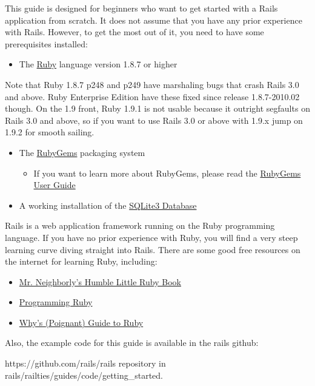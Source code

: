 \documentclass[10pt]{book}
\begin{document}
This guide is designed for beginners who want to get started with a Rails application from scratch. It does not assume that you have any prior experience with Rails. However, to get the most out of it, you need to have some prerequisites installed:
\begin{itemize}
	\item The \href{http://www.ruby-lang.org/en/downloads}{Ruby} language version 1.8.7 or higher
\end{itemize}

Note that Ruby 1.8.7 p248 and p249 have marshaling bugs that crash Rails 3.0 and above. Ruby Enterprise Edition have these fixed since release 1.8.7-2010.02 though. On the 1.9 front, Ruby 1.9.1 is not usable because it outright segfaults on Rails 3.0 and above, so if you want to use Rails 3.0 or above with 1.9.x jump on 1.9.2 for smooth sailing.
\begin{itemize}
	\item The \href{http://rubyforge.org/frs/?group_id=126}{RubyGems} packaging system  
\begin{itemize}
	\item If you want to learn more about RubyGems, please read the \href{http://docs.rubygems.org/read/book/1}{RubyGems User Guide}
\end{itemize}
	\item A working installation of the \href{http://www.sqlite.org/}{SQLite3 Database}
\end{itemize}

Rails is a web application framework running on the Ruby programming language. If you have no prior experience with Ruby, you will find a very steep learning curve diving straight into Rails. There are some good free resources on the internet for learning Ruby, including:
\begin{itemize}
	\item \href{http://www.humblelittlerubybook.com/}{Mr. Neighborly’s Humble Little Ruby Book}
	\item \href{http://www.ruby-doc.org/docs/ProgrammingRuby/}{Programming Ruby}
	\item \href{http://mislav.uniqpath.com/poignant-guide/}{Why’s (Poignant) Guide to Ruby}
\end{itemize}

Also, the example code for this guide is available in the rails github:

https://github.com/rails/rails repository in rails/railties/guides/code/getting\_started.
\end{document}
